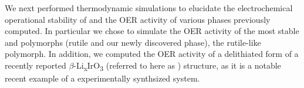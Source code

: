 %
%



%
We next performed  thermodynamic simulations to elucidate the electrochemical operational stability of \IrOx and the OER activity of various \IrOthree phases previously computed.
%
In particular we chose to simulate the OER activity of the most stable \IrOtwo and \IrOthree polymorphs (rutile and our newly discovered \aIrOthree phase), the rutile-like \IrOthree polymorph.
%
In addition, we computed the OER activity of a delithiated form of a recently reported $\beta$-Li\textsubscript{x}IrO\textsubscript{3} (referred to here as \bIrOthree) structure, as it is a notable recent example of a experimentally synthsized \IrOthree system.~\cite{Pearce2017}

